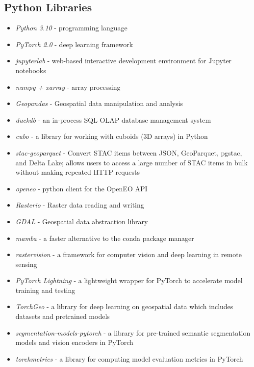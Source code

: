 \begin{multicols}{2}

\subsection{Python Libraries}
\begin{itemize}
    \item \textit{Python 3.10} - programming language  
    \item \textit{PyTorch 2.0} - deep learning framework 
    \item \textit{jupyterlab} - web-based interactive development environment for Jupyter notebooks
    \item \textit{numpy + xarray} - array processing
    \item \textit{Geopandas} - Geospatial data manipulation and analysis
    \item \textit{duckdb} - an in-process SQL OLAP database management system
    \item \textit{cubo} - a library for working with cuboids (3D arrays) in Python
    \item \textit{stac-geoparquet} - Convert STAC items between JSON, GeoParquet, pgstac, and Delta Lake; allows users to access a large number of STAC items in bulk without making repeated HTTP requests
    \item \textit{openeo} - python client for the OpenEO API
    \item \textit{Rasterio} - Raster data reading and writing
    \item \textit{GDAL} - Geospatial data abstraction library
    \item \textit{mamba} - a faster alternative to the conda package manager
    \item \textit{rastervision} - a framework for computer vision and deep learning in remote sensing
    \item \textit{PyTorch Lightning} - a lightweight wrapper for PyTorch to accelerate model training and testing
    \item \textit{TorchGeo} - a library for deep learning on geospatial data which includes datasets and pretrained models
    \item \textit{segmentation-models-pytorch} - a library for pre-trained semantic segmentation models and vision encoders in PyTorch
    \item \textit{torchmetrics} - a library for computing model evaluation metrics in PyTorch
\end{itemize}


\end{multicols}
